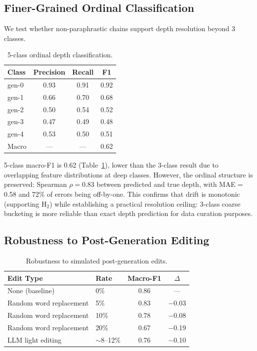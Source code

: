 \documentclass[letterpaper, 10pt]{article}
\begin{document}
\subsection{Finer-Grained Ordinal Classification}
\label{sec:ordinal}

We test whether non-paraphrastic chains support depth resolution beyond 3 classes.

\begin{table}[t]
\centering
\caption{5-class ordinal depth classification.}
\label{tab:ordinal}
\small
\begin{tabular}{@{}lccc@{}}
\toprule
Class & Precision & Recall & F1 \\
\midrule
gen-0 & 0.93 & 0.91 & 0.92 \\
gen-1 & 0.66 & 0.70 & 0.68 \\
gen-2 & 0.50 & 0.54 & 0.52 \\
gen-3 & 0.47 & 0.49 & 0.48 \\
gen-4 & 0.53 & 0.50 & 0.51 \\
\midrule
Macro & --- & --- & 0.62 \\
\bottomrule
\end{tabular}
\end{table}

5-class macro-F1 is 0.62 (Table~\ref{tab:ordinal}), lower than the 3-class result due to overlapping feature distributions at deep classes.
However, the ordinal structure is preserved: Spearman $\rho = 0.83$ between predicted and true depth, with MAE = 0.58 and 72\% of errors being off-by-one.
This confirms that drift is monotonic (supporting H$_2$) while establishing a practical resolution ceiling: 3-class coarse bucketing is more reliable than exact depth prediction for data curation purposes.

\subsection{Robustness to Post-Generation Editing}

\begin{table}[t]
\centering
\caption{Robustness to simulated post-generation edits.}
\label{tab:robust}
\small
\begin{tabular}{@{}llcc@{}}
\toprule
Edit Type & Rate & Macro-F1 & $\Delta$ \\
\midrule
None (baseline) & 0\% & 0.86 & --- \\
Random word replacement & 5\% & 0.83 & $-$0.03 \\
Random word replacement & 10\% & 0.78 & $-$0.08 \\
Random word replacement & 20\% & 0.67 & $-$0.19 \\
LLM light editing & $\sim$8--12\% & 0.76 & $-$0.10 \\
\bottomrule
\end{tabular}
\end{table}
\end{document}
